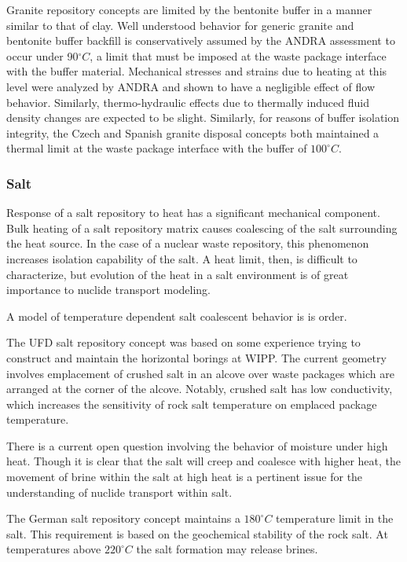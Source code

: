 Granite repository concepts are limited by the bentonite buffer in a manner 
similar to that of clay. 
Well understood behavior for generic granite and bentonite buffer backfill
is conservatively assumed by the \gls{ANDRA} assessment to occur under 
90$^\circ C$, a limit that must be imposed at the waste package interface with 
the buffer material.  Mechanical stresses and strains due to heating at this 
level were analyzed by \gls{ANDRA} and shown to have a negligible effect of 
flow behavior. Similarly, thermo-hydraulic effects due to thermally induced 
fluid density changes are expected to be slight. \cite{andra_argile:_2005}
Similarly, for reasons of buffer isolation integrity, the Czech and Spanish
granite disposal concepts both maintained a thermal limit at the waste package
interface with the buffer of $100^\circ C$.  \cite{von_lensa_red-impact_2008}

\subsubsection{Salt} 

Response of a salt repository to heat has a significant
mechanical component. Bulk heating of a salt repository matrix causes
coalescing  of the salt surrounding the heat source. In the case of a nuclear
waste repository, this phenomenon increases isolation capability of the salt. A
heat limit, then, is difficult to characterize, but evolution of the heat in a
salt environment is of great importance to nuclide transport modeling. 

A model of temperature dependent salt coalescent behavior is is order. 

The \gls{UFD} salt repository concept was based on some 
experience trying to construct and maintain the horizontal borings at WIPP. The 
current geometry involves emplacement of crushed salt in an alcove over waste
packages which are arranged at the corner of the alcove. Notably,  crushed salt 
has low conductivity, which increases the sensitivity of rock salt temperature 
on emplaced package temperature. 

There is a current open question involving the behavior of moisture under high 
heat. Though it is clear that the salt will creep and coalesce with higher heat, 
the movement of brine within the salt at high heat is a pertinent issue for the 
understanding of nuclide transport within salt.

The German salt repository concept maintains a $180^\circ C$ temperature limit 
in the salt. This requirement is based on the geochemical stability of the rock  
salt. At temperatures above $220^\circ C$ the salt formation may release 
brines.\cite{von_lensa_red-impact_2008}\cite{brewitz_long_2002}


